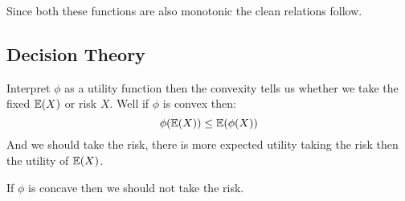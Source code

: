 Since both these functions are also monotonic the clean relations follow.

\subsection{Decision Theory} 
Interpret $\phi$ as a utility function then the convexity tells us whether we take the fixed $\operatorname{\mathbb{E}}(X)$ or risk $X$.
Well if $\phi$ is convex then:
\[\phi(\operatorname{\mathbb{E}}(X)) \leq \operatorname{\mathbb{E}}(\phi(X))\]
And we should take the risk,
there is more expected utility taking the risk then the utility of $\operatorname{\mathbb{E}}(X)$.

If $\phi$ is concave then we should not take the risk.
